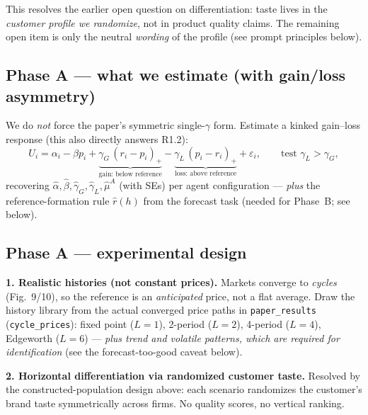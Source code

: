 \documentclass[11pt]{article}
\newcommand{\med}[1]{\textcolor{med}{#1}}
\begin{document}
\noindent This resolves the earlier open question on differentiation: taste lives in the \emph{customer
profile we randomize}, not in product quality claims. The remaining open item is only the neutral
\emph{wording} of the profile (see prompt principles below).

\subsection*{Phase A --- what we estimate (with gain/loss asymmetry)}

We do \emph{not} force the paper's symmetric single-$\gamma$ form. Estimate a kinked gain--loss response
(this also directly answers \med{R1.2}):
\[
U_i=\alpha_i-\beta p_i+\underbrace{\gamma_G\,(r_i-p_i)_+}_{\text{gain: below reference}}
-\underbrace{\gamma_L\,(p_i-r_i)_+}_{\text{loss: above reference}}+\varepsilon_i,
\qquad\text{test } \gamma_L>\gamma_G,
\]
recovering $\hat\alpha,\hat\beta,\hat\gamma_G,\hat\gamma_L,\hat\mu^{A}$ (with SEs) per agent configuration
--- \emph{plus} the reference-formation rule $\hat r(h)$ from the forecast task (needed for Phase~B; see
below).

\subsection*{Phase A --- experimental design}

\textbf{1. Realistic histories (not constant prices).} Markets converge to \emph{cycles} (Fig.~9/10), so
the reference is an \emph{anticipated} price, not a flat average. Draw the history library from the actual
converged price paths in \texttt{paper\_results} (\texttt{cycle\_prices}): fixed point ($L{=}1$), 2-period
($L{=}2$), 4-period ($L{=}4$), Edgeworth ($L{=}6$) --- \emph{plus trend and volatile patterns, which are
required for identification} (see the forecast-too-good caveat below).

\smallskip
\textbf{2. Horizontal differentiation via randomized customer taste.} Resolved by the
constructed-population design above: each scenario randomizes the customer's brand taste symmetrically
across firms. No quality scores, no vertical ranking.
\end{document}
